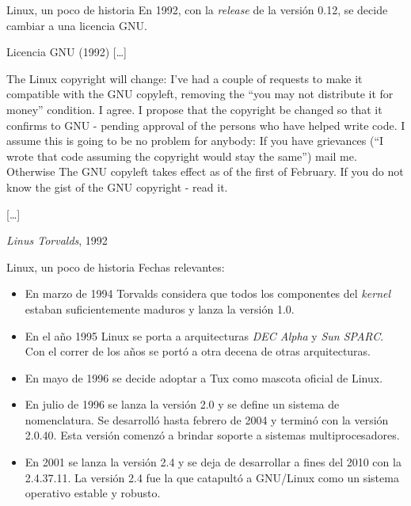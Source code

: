 \begin{frame}{Linux, un poco de historia}
En 1992, con la \textit{release} de la versión 0.12, se decide cambiar a
una licencia GNU.

\begin{block}{\alert{Licencia GNU} \hfill (1992)}
  [\ldots]

  The Linux copyright will change: I've had a couple of requests to make it
  compatible with the GNU copyleft, removing the ``you may not distribute
  it for money'' condition.  I agree.  I propose that the copyright be
  changed so that it confirms to GNU - pending approval of the persons who
  have helped write code.  I assume this is going to be no problem for
  anybody: If you have grievances (``I wrote that code assuming the
  copyright would stay the same'') mail me.  Otherwise The GNU copyleft
  takes effect as of the first of February.  If you do not know the gist of
  the GNU copyright - read it.

  [\ldots]

  \hfill \emph{Linus Torvalds}, 1992 \cite{Torvalds1992-2}
\end{block}
\end{frame}

\begin{frame}{Linux, un poco de historia}
Fechas relevantes:
\begin{itemize}
\item En marzo de 1994 Torvalds considera que todos los componentes del
  \textit{kernel} estaban suficientemente maduros y lanza la versión 1.0.

\item En el año 1995 Linux se porta a arquitecturas \textit{DEC Alpha} y
  \textit{Sun SPARC}. Con el correr de los años se portó a otra decena de
  otras arquitecturas.

\item En mayo de 1996 se decide adoptar a Tux como mascota oficial de
  Linux. 

\item En julio de 1996 se lanza la versión 2.0 y se define un sistema de
  nomenclatura. Se desarrolló hasta febrero de 2004 y terminó con la
  versión 2.0.40. Esta versión comenzó a brindar soporte a sistemas
  multiprocesadores.

\item En 2001 se lanza la versión 2.4 y se deja de desarrollar a fines del
  2010 con la 2.4.37.11. La versión 2.4 fue la que catapultó a GNU/Linux
  como un sistema operativo estable y robusto.
\end{itemize}
\end{frame}

